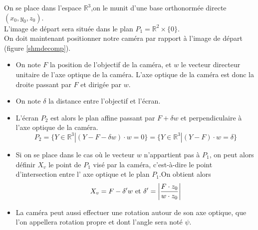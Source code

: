 \begin{defnot}
On se place dans l'espace $\mathbb{R}^{3}$,on le munit d'une base orthonormée directe $(x_0,y_0,z_0)$.\\
L'image de départ sera située dans le plan $P_{1}= \mathbb{R}^{2}\times \{0\}$.\\
On doit maintenant positionner notre caméra par rapport à l'image de départ (figure \ref{shmdecomp}).\\
\begin{itemize}
\item On note $F$ la position de l'objectif de la caméra, et $w$ le vecteur directeur unitaire de l'axe optique de la caméra. L'axe optique de la caméra est donc la droite passant par $F$ et dirigée par $w$.\\
\item On note $\delta$ la distance entre l'objectif et l'écran.\\
\item L'écran $P_{2}$ est alors le plan affine passant par $F+\delta w$ et perpendiculaire à l'axe optique de la caméra.
\begin{equation*}
P_{2}=\{Y\in \mathbb{R}^{3}|(Y-F-\delta w)\cdot w=0\}=\{Y\in \mathbb{R}^{3}|(Y-F)\cdot w=\delta\}
\end{equation*}
\item Si on se place dans le cas où le vecteur $w$ n'appartient pas à $P_{1}$, on peut alors définir $X_{v}$  le point de $P_{1}$ visé par la caméra, c'est-à-dire le point d'intersection entre l' axe optique et le plan $P_{1}$.On obtient alors
\begin{equation*}
X_{v}=F-\delta'w \text{ et }\delta'=\small{\left|\frac{F \cdot z_{0}}{w\cdot z_{0}} \right|}
\end{equation*}
\item La caméra peut aussi effectuer une rotation autour de son axe optique, que l'on appellera rotation propre et dont l'angle sera noté $\psi$.\\
\end{itemize}


\end{defnot}
